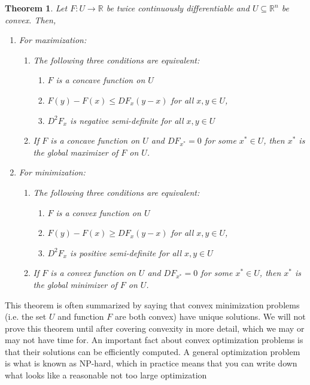 \documentclass[12pt,reqno]{amsart}
\newtheorem{theorem}{Theorem}[section]
\theoremstyle{definition}
\def\R{\mathbb{R}}
\renewcommand{\to}{{\rightarrow}}
\begin{document}
\begin{theorem}
  Let $F: U \to \R$ be twice continuously differentiable and $U
  \subseteq \R^n$ be convex. Then,
  \begin{enumerate}
  \item For maximization:
    \begin{enumerate}
    \item The following three conditions are equivalent:
      \begin{enumerate}
      \item $F$ is a concave function on $U$
      \item $F(y) - F(x) \leq DF_x(y-x)$ for all $x,y \in U$,
      \item $D^2 F_x$ is negative semi-definite for all $x, y \in U$
      \end{enumerate}
    \item If $F$ is a concave function on $U$ and $DF_{x^*} = 0$ for
      some $x^* \in U$, then
      $x^*$ is the global maximizer of $F$ on $U$.
    \end{enumerate}
  \item For minimization:
    \begin{enumerate}
    \item The following three conditions are equivalent:
      \begin{enumerate}
      \item $F$ is a convex function on $U$
      \item $F(y) - F(x) \geq DF_x(y-x)$ for all $x,y \in U$,
      \item $D^2 F_x$ is positive semi-definite for all $x, y \in U$
      \end{enumerate}
    \item If $F$ is a convex function on $U$ and $DF_{x^*} = 0$ for
      some $x^* \in U$, then
      $x^*$ is the global minimizer of $F$ on $U$.
    \end{enumerate}
  \end{enumerate}
\end{theorem}
This theorem is often summarized by saying that convex minimization
problems (i.e. the set $U$ and function $F$ are both convex) have
unique solutions.  We will not prove this theorem until after covering
convexity in more detail, which we may or may not have time for. An
important fact about convex optimization problems is that their
solutions can be efficiently computed. A general optimization problem
is what is known as NP-hard, which in practice means that you can
write down what looks like a reasonable not too large optimization
\end{document}
